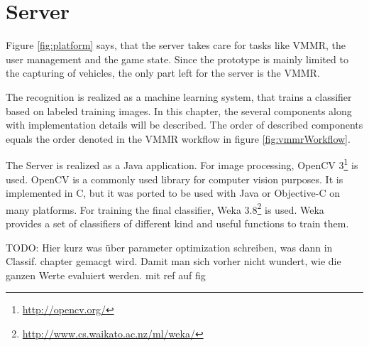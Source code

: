 \section{Server}
Figure \ref{fig:platform} says, that the server takes care for tasks like VMMR, the user management and the game state. Since the prototype is mainly limited to the capturing of vehicles, the only part left for the server is the VMMR.

The recognition is realized as a machine learning system, that trains a classifier based on labeled training images. In this chapter, the several components along with implementation details will be described. The order of described components equals the order denoted in the VMMR workflow in figure \ref{fig:vmmrWorkflow}.

The Server is realized as a Java application. For image processing, OpenCV 3\footnote{\url{http://opencv.org/}} is used. OpenCV is a commonly used library for computer vision purposes. It is implemented in C, but it was ported to be used with Java or Objective-C on many platforms. For training the final classifier, Weka 3.8\footnote{\url{http://www.cs.waikato.ac.nz/ml/weka/}} is used. Weka provides a set of classifiers of different kind and useful functions to train them.

TODO: Hier kurz was über parameter optimization schreiben, was dann in Classif. chapter gemacgt wird. Damit man sich vorher nicht wundert, wie die ganzen Werte evaluiert werden. mit ref auf fig

